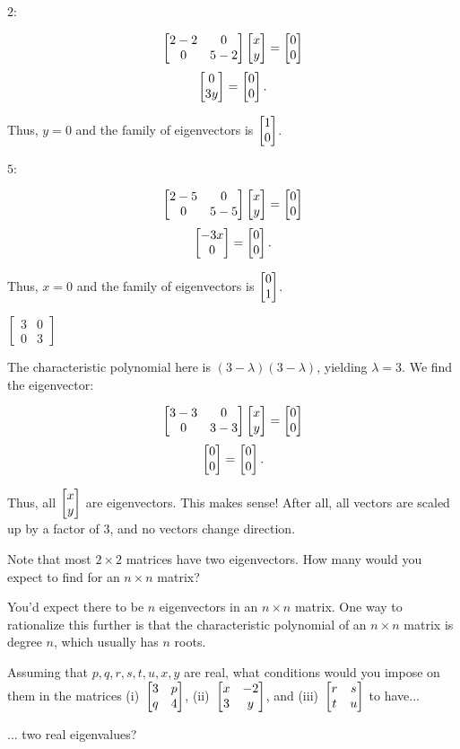 \documentclass[../gatm_answers.tex]{subfiles}
\begin{document}
$2$:

$$\begin{bmatrix} 2-2 & 0 \\ 0 & 5-2 \end{bmatrix}\begin{bmatrix} x \\ y \end{bmatrix} = \begin{bmatrix} 0 \\ 0 \end{bmatrix}$$
$$\begin{bmatrix} 0 \\ 3y \end{bmatrix} = \begin{bmatrix} 0 \\ 0 \end{bmatrix}.$$

Thus, $y=0$ and the family of eigenvectors is $\begin{bmatrix} 1 \\ 0 \end{bmatrix}$.

$5$:

$$\begin{bmatrix} 2-5 & 0 \\ 0 & 5-5 \end{bmatrix}\begin{bmatrix} x \\ y \end{bmatrix} = \begin{bmatrix} 0 \\ 0 \end{bmatrix}$$
$$\begin{bmatrix} -3x \\ 0 \end{bmatrix} = \begin{bmatrix} 0 \\ 0 \end{bmatrix}.$$

Thus, $x=0$ and the family of eigenvectors is $\begin{bmatrix} 0 \\ 1 \end{bmatrix}$.

\begin{inner_problem}
\item $\left[\begin{smallmatrix} 3 & 0 \\ 0 & 3 \end{smallmatrix}\right]$
\end{inner_problem}

The characteristic polynomial here is $(3-\lambda)(3-\lambda)$, yielding $\lambda = 3$. We find the eigenvector:

$$\begin{bmatrix} 3-3 & 0 \\ 0 & 3-3 \end{bmatrix}\begin{bmatrix} x \\ y \end{bmatrix} = \begin{bmatrix} 0 \\ 0 \end{bmatrix}$$
$$\begin{bmatrix} 0 \\ 0 \end{bmatrix} = \begin{bmatrix} 0 \\ 0 \end{bmatrix}.$$

Thus, all $\begin{bmatrix} x \\ y \end{bmatrix}$ are eigenvectors. This makes sense! After all, all vectors are scaled up by a factor of $3$, and no vectors change direction.

\begin{outer_problem}
\item Note that most $2\times 2$ matrices have two eigenvectors. How many would you expect to find for an $n\times n$ matrix?
\end{outer_problem}

You'd expect there to be $n$ eigenvectors in an $n\times n$ matrix. One way to rationalize this further is that the characteristic polynomial of an $n\times n$ matrix is degree $n$, which usually has $n$ roots.

\begin{outer_problem}
\item Assuming that $p,q,r,s,t,u,x,y$ are real, what conditions would you impose on them in the matrices (i)~$\begin{bmatrix} 3 & p \\ q & 4 \end{bmatrix}$, (ii)~$\begin{bmatrix} x & -2 \\ 3 & y \end{bmatrix}$, and (iii)~$\begin{bmatrix} r & s \\ t & u \end{bmatrix}$ to have...
\end{outer_problem}

\begin{inner_problem}[start=1]
\item ... two real eigenvalues?
\end{inner_problem}
\end{document}
